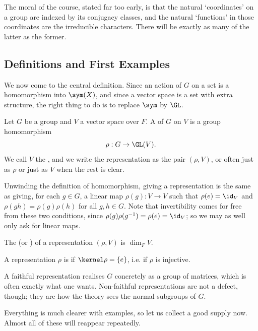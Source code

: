 The moral of the course, stated far too early, is that the natural `coordinates' on a group are indexed by its conjugacy classes, and the natural `functions' in those coordinates are the irreducible characters. There will be exactly as many of the latter as the former.

\subsection{Definitions and First Examples}

We now come to the central definition. Since an action of $G$ on a set is a homomorphism into $\sym(X)$, and since a vector space is a set with extra structure, the right thing to do is to replace $\sym$ by $\GL$.

\begin{definition}[Representation]
	Let $G$ be a group and $V$ a vector space over $F$. A  of $G$ on $V$ is a group homomorphism
	$$\rho : G \to \GL(V).$$
	We call $V$ the , and we write the representation as the pair $(\rho, V)$, or often just as $\rho$ or just as $V$ when the rest is clear.
\end{definition}

Unwinding the definition of homomorphism, giving a representation is the same as giving, for each $g \in G$, a linear map $\rho(g) : V \to V$ such that $\rho(e) = \id_V$ and $\rho(gh) = \rho(g)\rho(h)$ for all $g,h \in G$. Note that invertibility comes for free from these two conditions, since $\rho(g)\rho(g^{-1}) = \rho(e) = \id_V$; so we may as well only ask for linear maps.

\begin{definition}[Degree]
	The  (or ) of a representation $(\rho, V)$ is $\dim_F V$.
\end{definition}

\begin{definition}
	A representation $\rho$ is  if $\kernel \rho = \{e\}$, i.e. if $\rho$ is injective.
\end{definition}

A faithful representation realises $G$ concretely as a group of matrices, which is often exactly what one wants. Non-faithful representations are not a defect, though; they are how the theory sees the normal subgroups of $G$.

Everything is much clearer with examples, so let us collect a good supply now. Almost all of these will reappear repeatedly.

